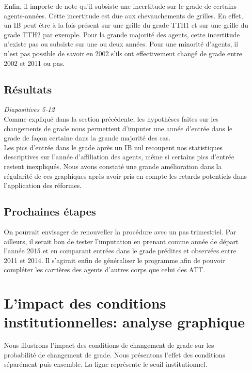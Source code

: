 \documentclass[11pt,a4paper]{article}
\begin{document}
Enfin, il importe de note qu'il subsiste une incertitude sur le grade de certains agents-années. Cette incertitude est due aux chevauchements de grilles. En effet, un IB peut être à la fois présent sur une grille du grade TTH1 et sur une grille du grade TTH2 par exemple. Pour la grande majorité des agents, cette incertitude n'existe pas ou subsiste sur une ou deux années. Pour une minorité d'agents, il n'est pas possible de savoir en 2002 s'ils ont effectivement changé de grade entre 2002 et 2011 ou pas.\\

\subsection{Résultats}

\textit{Diapositives 5-12}\\

Comme expliqué dans la section précédente, les hypothèses faites sur les changements de grade nous permettent d'imputer une année d'entrée dans le grade de façon certaine dans la grande majorité des cas.\\

Les pics d'entrée dans le grade après un IB nul recoupent nos statistiques descriptives sur l'année d'affiliation des agents, même si certains pics d'entrée restent inexpliqués. Nous avons constaté une grande amélioration dans la régularité de ces graphiques après avoir pris en compte les retards potentiels dans l'application des réformes.

\subsection{Prochaines étapes}

On pourrait envisager de renouveller la procédure avec un pas trimestriel.
Par ailleurs, il serait bon de tester l'imputation en prenant comme année de départ l'année 2015 et en comparant entrées dans le grade prédites et observées entre 2011 et 2014.
Il s'agirait enfin de généraliser le programme afin de pouvoir compléter les carrières des agents d'autres corps que celui des ATT.

\section{L'impact des conditions institutionnelles: analyse graphique}

Nous illustrons l'impact des conditions de changement de grade sur les probabilité de changement de grade. Nous présentons l'effet des conditions séparément puis ensemble. La ligne représente le seuil institutionnel. 
\end{document}
